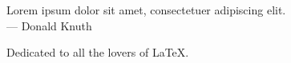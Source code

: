 
\cleardoublepage
{}
\thispagestyle{empty}

\vspace*{3cm}

\begin{center}
Lorem ipsum dolor sit amet, consectetuer adipiscing elit. \\ \medskip
--- Donald Knuth    
\end{center}

\medskip

\begin{center}
Dedicated to all the lovers of \LaTeX.
\end{center}
